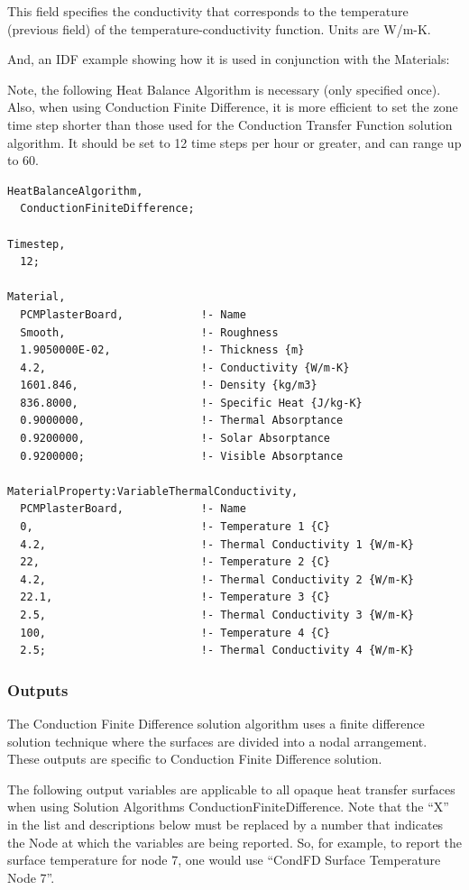 This field specifies the conductivity that corresponds to the temperature (previous field) of the temperature-conductivity function. Units are W/m-K.

And, an IDF example showing how it is used in conjunction with the Materials:

Note, the following Heat Balance Algorithm is necessary (only specified once). Also, when using Conduction Finite Difference, it is more efficient to set the zone time step shorter than those used for the Conduction Transfer Function solution algorithm. It should be set to 12 time steps per hour or greater, and can range up to 60.

\begin{lstlisting}
HeatBalanceAlgorithm,
  ConductionFiniteDifference;

Timestep,
  12;

Material,
  PCMPlasterBoard,            !- Name
  Smooth,                     !- Roughness
  1.9050000E-02,              !- Thickness {m}
  4.2,                        !- Conductivity {W/m-K}
  1601.846,                   !- Density {kg/m3}
  836.8000,                   !- Specific Heat {J/kg-K}
  0.9000000,                  !- Thermal Absorptance
  0.9200000,                  !- Solar Absorptance
  0.9200000;                  !- Visible Absorptance

MaterialProperty:VariableThermalConductivity,
  PCMPlasterBoard,            !- Name
  0,                          !- Temperature 1 {C}
  4.2,                        !- Thermal Conductivity 1 {W/m-K}
  22,                         !- Temperature 2 {C}
  4.2,                        !- Thermal Conductivity 2 {W/m-K}
  22.1,                       !- Temperature 3 {C}
  2.5,                        !- Thermal Conductivity 3 {W/m-K}
  100,                        !- Temperature 4 {C}
  2.5;                        !- Thermal Conductivity 4 {W/m-K}
\end{lstlisting}

\subsubsection{Outputs}\label{outputs-1-026}

The Conduction Finite Difference solution algorithm uses a finite difference solution technique where the surfaces are divided into a nodal arrangement. These outputs are specific to Conduction Finite Difference solution.

The following output variables are applicable to all opaque heat transfer surfaces when using Solution Algorithms ConductionFiniteDifference.  Note that the ``X'' in the list and descriptions below must be replaced by a number that indicates the Node at which the variables are being reported.  So, for example, to report the surface temperature for node 7, one would use ``CondFD Surface Temperature Node 7''.

